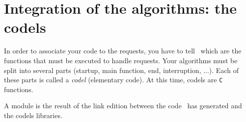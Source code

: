 
\section{Integration of the algorithms: the codels}
\label{sec|module|codels}

In order to associate your code to the requests, you have to tell \GenoM\
which are the  functions that must be  executed to  handle requests. Your
algorithms must be split into several parts (startup, main function, end,
interruption, ...).   Each  of  these   parts  is called  a   {\em codel}
(elementary code). At this time, codels are {\tt C} functions.

A module is the result of  the link edition between  the code \GenoM\ has
generated and the codels libraries.
